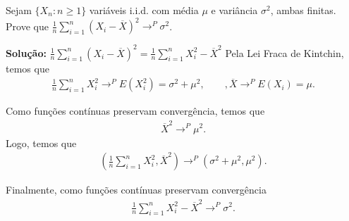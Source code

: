 \begin{frame}


\begin{exem}
Sejam $\{X_n:n\geq 1\}$ variáveis i.i.d. com média $\mu$ e variância $\sigma^2$, ambas finitas. Prove que
$\frac{1}{n}\sum_{i=1}^{n}(X_i-\overline{X})^2\rightarrow^P \sigma^2$. \bigskip

{\bf Solução:}
$\frac{1}{n}\sum_{i=1}^{n}(X_i-\overline{X})^2
=\frac{1}{n}\sum_{i=1}^{n}X_i^2-\overline{X}^2
$
Pela Lei Fraca de Kintchin, temos que
\begin{eqnarray}
\frac{1}{n}\sum_{i=1}^{n}X_i^2\rightarrow^P E(X_i^2)=\sigma^2+\mu^2, \qquad, 
\overline{X}\rightarrow^P E(X_i)=\mu.\nonumber
\end{eqnarray}

Como funções contínuas preservam convergência, temos que
\begin{eqnarray}
\overline{X}^2\rightarrow^P \mu^2.\nonumber
\end{eqnarray}
Logo, temos que
\begin{eqnarray}
(\frac{1}{n}\sum_{i=1}^{n}X_i^2,\overline{X}^2)\rightarrow^P (\sigma^2+\mu^2,\mu^2).\nonumber
\end{eqnarray}

Finalmente, como funções contínuas preservam convergência
\begin{eqnarray}
\frac{1}{n}\sum_{i=1}^{n}X_i^2-\overline{X}^2\rightarrow^P \sigma^2.\nonumber
\end{eqnarray}


\end{exem}
\end{frame}

